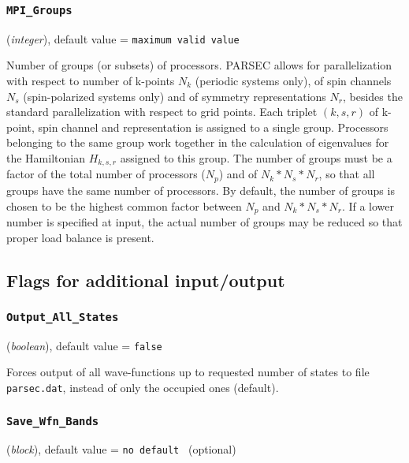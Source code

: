 \documentclass{article}
\begin{document}
\subsubsection{\tt MPI\_Groups 
\label{MPIGroups}}
({\it integer}),
default value = {\tt maximum valid value }

Number of groups (or subsets) of processors. PARSEC allows for
parallelization with respect to number of k-points $N_k$ (periodic systems
only), of spin channels $N_s$ (spin-polarized systems only) and of
symmetry representations $N_r$, besides the standard parallelization
with respect to grid points. Each triplet $(k,s,r)$ of k-point,
spin channel and representation is assigned to a single
group. Processors belonging to the same group work together in the
calculation of eigenvalues for the Hamiltonian $H_{k,s,r}$ assigned to
this group. The number of groups must be a factor of the total number
of processors ($N_p$) and of $N_k * N_s * N_r$, so that all groups have the
same number of processors. By default, the number of groups is chosen
to be the highest common factor between $N_p$ and $N_k * N_s *
N_r$. If a lower number is specified at input, the actual number of
groups may be reduced so that proper load balance is present.







\subsection{Flags for additional input/output}

\subsubsection{\tt Output\_All\_States 
\label{OutputAllStates}}
({\it boolean}),
default value = {\tt false }

Forces output of all wave-functions up to requested number of states to file
{\tt parsec.dat}, instead of only the occupied ones (default).

\subsubsection{\tt Save\_Wfn\_Bands 
\label{SaveWfnBands}}
({\it block}),
default value = {\tt no default } (optional)
\end{document}
